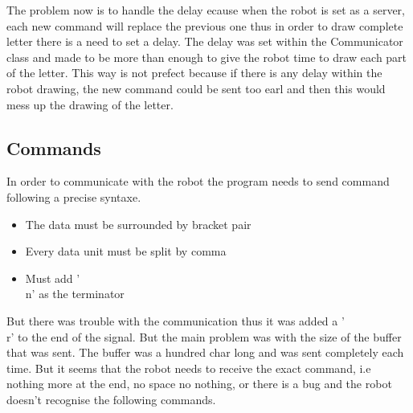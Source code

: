 The problem now is to handle the delay ecause when the robot is set as a server, each new command will replace the previous one thus in order to draw complete letter there is a need to set a delay. The delay was set within the Communicator class and made to be more than enough to give the robot time to draw each part of the letter. This way is not prefect because if there is any delay within the robot drawing, the new command could be sent too earl and then this would mess up the drawing of the letter.

\subsection{Commands}

In order to communicate with the robot the program needs to send command following a precise syntaxe.
\begin{itemize}
  \item The data must be surrounded by bracket pair
  \item Every data unit must be split by comma
  \item Must add '\\n' as the terminator
\end{itemize}

But there was trouble with the communication thus it was added a '\\r' to the end of the signal. But the main problem was with the size of the buffer that was sent. The buffer was a hundred char long and was sent completely each time. But it seems that the robot needs to receive the exact command, i.e nothing more at the end, no space no nothing, or there is a bug and the robot doesn't recognise the following commands.
